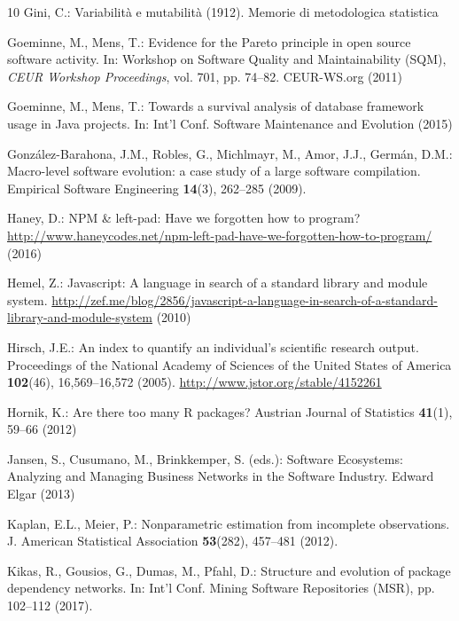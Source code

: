 \documentclass[smallextended]{svjour3}       %
\begin{document}
\begin{thebibliography}{10}
Gini, C.: Variabilit{\`a} e mutabilit{\`a} (1912).
\newblock Memorie di metodologica statistica

Goeminne, M., Mens, T.: Evidence for the {Pareto} principle in open source
  software activity.
\newblock In: Workshop on Software Quality and Maintainability ({SQM}),
  \emph{CEUR Workshop Proceedings}, vol. 701, pp. 74--82. CEUR-WS.org (2011)

Goeminne, M., Mens, T.: Towards a survival analysis of database framework usage
  in {Java} projects.
\newblock In: Int'l Conf. Software Maintenance and Evolution (2015)

Gonz{\'{a}}lez{-}Barahona, J.M., Robles, G., Michlmayr, M., Amor, J.J.,
  Germ{\'{a}}n, D.M.: Macro-level software evolution: a case study of a large
  software compilation.
\newblock Empirical Software Engineering \textbf{14}(3), 262--285 (2009).
\newblock {}

Haney, D.: {NPM} \& left-pad: Have we forgotten how to program?
\newblock
  \url{http://www.haneycodes.net/npm-left-pad-have-we-forgotten-how-to-program/}
  (2016)

Hemel, Z.: Javascript: A language in search of a standard library and module
  system.
\newblock
  \url{http://zef.me/blog/2856/javascript-a-language-in-search-of-a-standard-library-and-module-system}
  (2010)

Hirsch, J.E.: An index to quantify an individual's scientific research output.
\newblock Proceedings of the National Academy of Sciences of the United States
  of America \textbf{102}(46), 16,569--16,572 (2005).
\newblock \urlprefix\url{http://www.jstor.org/stable/4152261}

Hornik, K.: Are there too many {R} packages?
\newblock Austrian Journal of Statistics \textbf{41}(1), 59--66 (2012)

Jansen, S., Cusumano, M., Brinkkemper, S. (eds.): Software Ecosystems:
  Analyzing and Managing Business Networks in the Software Industry.
\newblock Edward Elgar (2013)

Kaplan, E.L., Meier, P.: Nonparametric estimation from incomplete observations.
\newblock J. American Statistical Association \textbf{53}(282), 457--481
  (2012).
\newblock {}

Kikas, R., Gousios, G., Dumas, M., Pfahl, D.: Structure and evolution of
  package dependency networks.
\newblock In: Int'l Conf. Mining Software Repositories ({MSR}), pp. 102--112
  (2017).
\newblock {}


\end{thebibliography}
\end{document}
